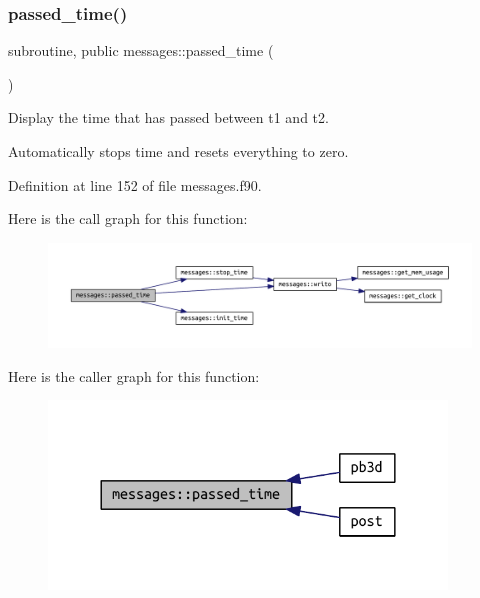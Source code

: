 \subsubsection{\texorpdfstring{passed\+\_\+time()}{passed\_time()}}
{\footnotesize\ttfamily subroutine, public messages\+::passed\+\_\+time (\begin{DoxyParamCaption}{ }\end{DoxyParamCaption})}



Display the time that has passed between {\ttfamily t1} and {\ttfamily t2}. 

Automatically stops time and resets everything to zero. 

Definition at line 152 of file messages.\+f90.

Here is the call graph for this function\+:\nopagebreak
\begin{figure}[H]
\begin{center}
\leavevmode
\includegraphics[width=350pt]{namespacemessages_a34da9df28502ccd63e62674d51fe8de8_cgraph}
\end{center}
\end{figure}
Here is the caller graph for this function\+:\nopagebreak
\begin{figure}[H]
\begin{center}
\leavevmode
\includegraphics[width=300pt]{namespacemessages_a34da9df28502ccd63e62674d51fe8de8_icgraph}
\end{center}
\end{figure}
\mbox{\label{namespacemessages_a5686118397930f505259225f3688216b}} 
